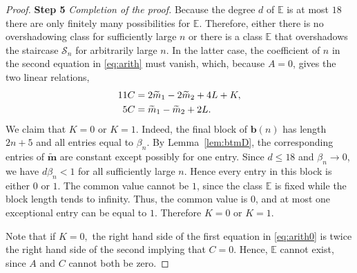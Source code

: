 \documentclass[11pt, reqno]{amsart}
\theoremstyle{remark}
\numberwithin{equation}{subsection}
\numberwithin{figure}{section}
\theoremstyle{customremark}
\newcommand{\NI}{{\noindent}}
\newcommand{\Ss}{{\mathcal S}}
\newcommand{\bE}{{\mathbb E}}
\newcommand{\btm}{\widetilde{\bm{m}}}
\begin{document}
\begin{proof}
   \NI {\bf Step 5} {\it Completion of the proof.}
   Because the degree $d$ of $\bE$ is at most $18$ there are only finitely many possibilities for $\bE$.
    Therefore, either there is no overshadowing class for sufficiently large $n$ or there is a class $\bE$ that overshadows the staircase $\Ss_n$ for arbitrarily large  $n$.  In the latter case, the coefficient of $n$ in the second equation in \eqref{eq:arith} must vanish, which, because $A = 0$, gives the  two linear relations,
    \begin{align}\label{eq:arith0}
    11C  &= 2\widetilde m_1 - 2 \widetilde m_2 + 4L + K,\\ \notag
    5C & = \widetilde m_1 -  \widetilde m_2 + 2L.
    \end{align}
    We claim that $K=0$ or $K=1$. Indeed, the final block of $\bm b(n)$ has length
$2n+5$ and all entries equal to $\beta_n$. By Lemma~\ref{lem:btmD}, the corresponding
entries of $\btm$ are constant except possibly for one entry. Since $d\leq18$ and
$\beta_n\to0$, we have $d\beta_n<1$ for all sufficiently large $n$. Hence every entry
in this block is either $0$ or $1$. The common value cannot be $1$, since the class
$\bE$ is fixed while the block length tends to infinity. Thus, the common value is $0$,
and at most one exceptional entry can be equal to $1$. Therefore $K=0$ or $K=1$.

Note that if $K=0,$ the right hand side of the first equation in \eqref{eq:arith0} is twice the right hand side of the second implying that $C=0$. Hence, $\bE$ cannot exist, since  $A$ and $C$ cannot both be zero. 



\end{proof}
\end{document}
